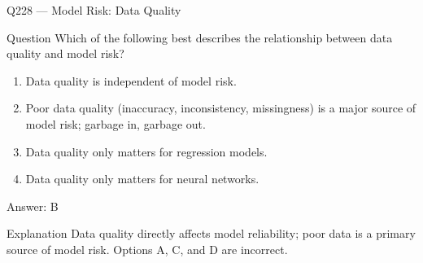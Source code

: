 \documentclass[aspectratio=169,8pt]{beamer}
\begin{document}
																																			\begin{frame}{Q228 --- Model Risk: Data Quality}
																																				\begin{block}{Question}
																																					Which of the following best describes the relationship between data quality and model risk?
																																					\begin{enumerate}
																																						\item Data quality is independent of model risk.
																																						\item Poor data quality (inaccuracy, inconsistency, missingness) is a major source of model risk; garbage in, garbage out.
																																						\item Data quality only matters for regression models.
																																						\item Data quality only matters for neural networks.
																																					\end{enumerate}  \end{block}
																																					\begin{exampleblock}{Answer: B}\end{exampleblock}
																																					\begin{block}{Explanation}
																																						Data quality directly affects model reliability; poor data is a primary source of model risk. Options A, C, and D are incorrect.
																																					\end{block}
																																				\end{frame}
																																				
\end{document}

